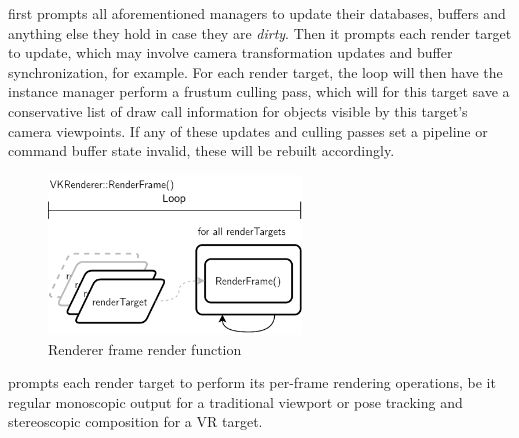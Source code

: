  first prompts all aforementioned managers to update their databases, buffers and anything else they hold in case they are \textit{dirty}. Then it prompts each render target to update, which may involve camera transformation updates and buffer synchronization, for example. For each render target, the loop will then have the instance manager perform a frustum culling pass, which will for this target save a conservative list of draw call information for objects visible by this target's camera viewpoints. 
If any of these updates and culling passes set a pipeline or command buffer state invalid, these will be rebuilt accordingly.  

\begin{figure}[htb]
  \centering
  \includegraphics[width=0.6\textwidth]{pictures/Tachyon_VKRenderer_RenderFrame}
  \caption[VKRenderer's RenderFrame]{Renderer frame render function}\label{fig:lst_VKRenderer_RenderFrame}
\end{figure} 

 prompts each render target to perform its per-frame rendering operations, be it regular monoscopic output for a traditional viewport or pose tracking and stereoscopic composition for a \gls{VR} target. 

